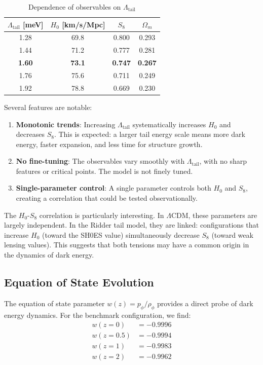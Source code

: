 \begin{table}[h]
\centering
\caption{Dependence of observables on $\Lambda_{\text{tail}}$}
\label{tab:lambda_scan}
\begin{tabular}{cccc}
\hline
$\Lambda_{\text{tail}}$ [meV] & $H_0$ [km/s/Mpc] & $S_8$ & $\Omega_m$ \\
\hline
1.28 & 69.8 & 0.800 & 0.293 \\
1.44 & 71.2 & 0.777 & 0.281 \\
\textbf{1.60} & \textbf{73.1} & \textbf{0.747} & \textbf{0.267} \\
1.76 & 75.6 & 0.711 & 0.249 \\
1.92 & 78.8 & 0.669 & 0.230 \\
\hline
\end{tabular}
\end{table}

Several features are notable:

\begin{enumerate}
    \item \textbf{Monotonic trends}: Increasing $\Lambda_{\text{tail}}$ systematically increases $H_0$ and decreases $S_8$. This is expected: a larger tail energy scale means more dark energy, faster expansion, and less time for structure growth.
    
    \item \textbf{No fine-tuning}: The observables vary smoothly with $\Lambda_{\text{tail}}$, with no sharp features or critical points. The model is not finely tuned.
    
    \item \textbf{Single-parameter control}: A single parameter controls both $H_0$ and $S_8$, creating a correlation that could be tested observationally.
\end{enumerate}

The $H_0$-$S_8$ correlation is particularly interesting. In $\Lambda$CDM, these parameters are largely independent. In the Ridder tail model, they are linked: configurations that increase $H_0$ (toward the SH0ES value) simultaneously decrease $S_8$ (toward weak lensing values). This suggests that both tensions may have a common origin in the dynamics of dark energy.

\subsection{Equation of State Evolution}

The equation of state parameter $w(z) = p_\phi / \rho_\phi$ provides a direct probe of dark energy dynamics. For the benchmark configuration, we find:
\begin{align}
w(z=0) &= -0.9996 \\
w(z=0.5) &= -0.9994 \\
w(z=1) &= -0.9983 \\
w(z=2) &= -0.9962
\end{align}

